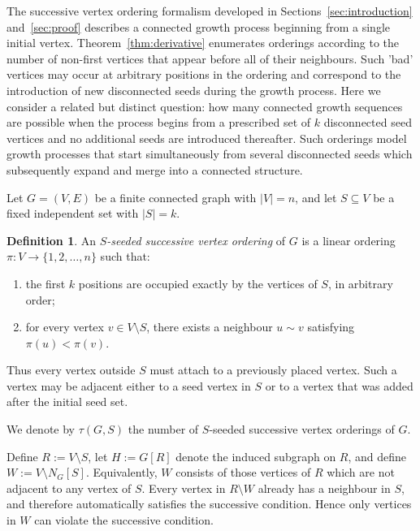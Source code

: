 \documentclass[11pt,a4paper]{article}
\numberwithin{equation}{section}
\theoremstyle{plain}
\theoremstyle{definition}
\newtheorem{definition}[theorem]{Definition}
\theoremstyle{remark}
\begin{document}
The successive vertex ordering formalism developed in Sections~\ref{sec:introduction} and~\ref{sec:proof} describes a connected growth process beginning from a single initial vertex.  Theorem~\ref{thm:derivative} enumerates orderings according to the number of non-first vertices that appear before all of their neighbours. Such 'bad' vertices may occur at arbitrary positions in the ordering and correspond to the introduction of new disconnected seeds during the growth process. Here we consider a related but distinct question: how many connected growth sequences are possible when the process begins from a prescribed set of $k$ disconnected seed vertices and no additional seeds are introduced thereafter. Such orderings model growth processes that start simultaneously from several disconnected seeds which subsequently expand and merge into a connected structure.

Let \(G=(V,E)\) be a finite connected graph with \(|V|=n\), and let \(S\subseteq V\) be a fixed independent set with \(|S|=k\). 

\begin{definition}
\label{def:seeded}
An \emph{\(S\)-seeded successive vertex ordering} of \(G\) is a linear ordering
\(\pi:V\to\{1,2,\dots,n\}\) such that:
\begin{enumerate}
\item the first \(k\) positions are occupied exactly by the vertices of \(S\), in arbitrary order;

\item for every vertex \(v\in V\setminus S\), there exists a neighbour \(u\sim v\) satisfying \(\pi(u)<\pi(v)\).
\end{enumerate}
\end{definition}

Thus every vertex outside \(S\) must attach to a previously placed vertex. Such a vertex may be adjacent either to a seed vertex in \(S\) or to a vertex that was added after the initial seed set.

We denote by \(\tau(G,S)\) the number of \(S\)-seeded successive vertex orderings of \(G\).

Define \(R:=V\setminus S\), let \(H:=G[R]\) denote the induced subgraph on \(R\), and define
\(
W:=V\setminus N_G[S].
\)
Equivalently, \(W\) consists of those vertices of \(R\) which are not adjacent to any vertex of \(S\). Every vertex in \(R\setminus W\) already has a neighbour in \(S\), and therefore automatically satisfies the successive condition. Hence only vertices in \(W\) can violate the successive condition.
\end{document}
